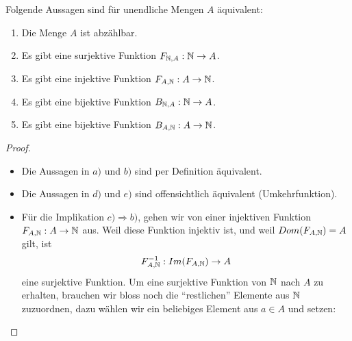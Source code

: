 \begin{satz}
    Folgende Aussagen sind für unendliche Mengen $A$ äquivalent:
    \begin{enumerate}
        \item Die Menge $A$ ist abzählbar.
        \item Es gibt eine surjektive Funktion $F_{\mathbb{N},A}:\mathbb{N}\to A$.
        \item Es gibt eine injektive Funktion $F_{A,\mathbb{N}}:A\to\mathbb{N}$.
        \item Es gibt eine bijektive Funktion $B_{\mathbb{N},A}:\mathbb{N}\to A$.
        \item Es gibt eine bijektive Funktion $B_{A,\mathbb{N}}:A\to\mathbb{N}$.
    \end{enumerate}
\end{satz}
\begin{proof}~
    \begin{itemize}
        \item Die Aussagen in $a)$ und $b)$ sind per Definition äquivalent.
        \item Die Aussagen in $d)$ und $e)$ sind offensichtlich äquivalent (Umkehrfunktion).
        \item Für die Implikation $c)\Rightarrow b)$, gehen wir von einer injektiven Funktion $F_{A,\mathbb{N}}:A\to\mathbb{N}$ aus.
        Weil diese Funktion injektiv ist, und weil $Dom(F_{A,\mathbb{N}})=A$ gilt, ist
        \begin{align*}
            F_{A,\mathbb{N}}^{-1}:Im(F_{A,\mathbb{N}}) \to A
        \end{align*}
        eine surjektive Funktion. Um eine surjektive Funktion von $\mathbb{N}$ nach $A$ zu erhalten, brauchen wir bloss noch die ``restlichen'' Elemente aus $\mathbb{N}$ zuzuordnen, dazu wählen wir ein beliebiges Element aus $a\in A$ und setzen:

\end{itemize}
\end{proof}
